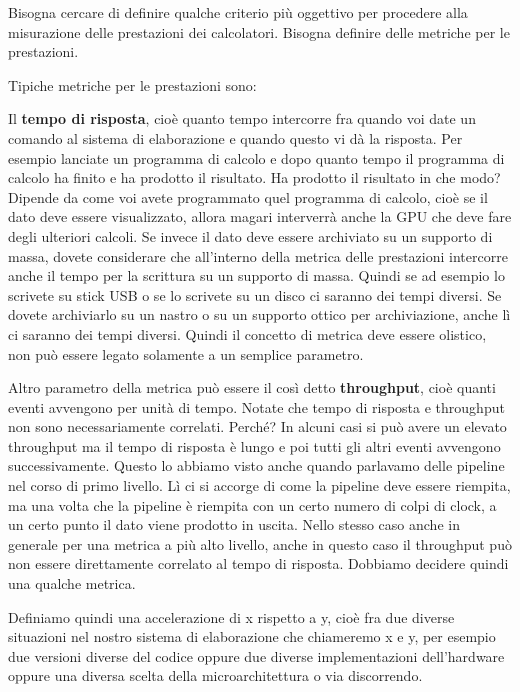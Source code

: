 Bisogna cercare di definire qualche criterio più oggettivo per procedere alla misurazione delle prestazioni dei calcolatori.
Bisogna definire delle metriche per le prestazioni.

Tipiche metriche per le prestazioni sono:

Il \textbf{tempo di risposta}, cioè quanto tempo intercorre fra quando voi date un comando al sistema di elaborazione e quando questo vi dà la risposta.
Per esempio lanciate un programma di calcolo e dopo quanto tempo il programma di calcolo ha finito e ha prodotto il risultato.
Ha prodotto il risultato in che modo? Dipende da come voi avete programmato quel programma di calcolo, cioè se il dato deve essere visualizzato, allora magari interverrà anche la GPU che deve fare degli ulteriori calcoli. Se invece il dato deve essere archiviato su un supporto di massa, dovete considerare che all'interno della metrica delle prestazioni intercorre anche il tempo per la scrittura su un supporto di massa.
Quindi se ad esempio lo scrivete su stick USB o se lo scrivete su un disco ci saranno dei tempi diversi.
Se dovete archiviarlo su un nastro o su un supporto ottico per archiviazione, anche lì ci saranno dei tempi diversi.
Quindi il concetto di metrica deve essere olistico, non può essere legato solamente a un semplice parametro.

Altro parametro della metrica può essere il così detto \textbf{throughput}, cioè quanti eventi avvengono per unità di tempo.
Notate che tempo di risposta e throughput non sono necessariamente correlati. Perché? 
In alcuni casi si può avere un elevato throughput ma il tempo di risposta è lungo e poi tutti gli altri eventi avvengono successivamente.
Questo lo abbiamo visto anche quando parlavamo delle pipeline nel corso di primo livello.
Lì ci si accorge di come la pipeline deve essere riempita, ma una volta che la pipeline è riempita con un certo numero di colpi di clock, a un certo punto il dato viene prodotto in uscita.
Nello stesso caso anche in generale per una metrica a più alto livello, anche in questo caso il throughput può non essere direttamente correlato al tempo di risposta.
Dobbiamo decidere quindi una qualche metrica.

Definiamo quindi una accelerazione di x rispetto a y, cioè fra due diverse situazioni nel nostro sistema di elaborazione che chiameremo x e y, per esempio due versioni diverse del codice oppure due diverse implementazioni dell'hardware oppure una diversa scelta della microarchitettura o via discorrendo.


